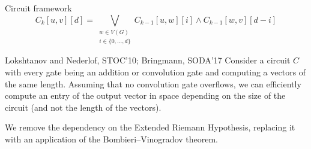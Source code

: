 \begin{frame}{Circuit framework}
    $$C_k[u,v][d]=\bigvee_{\substack{w\in V(G) \\  i\in \{0,\ldots,d\}}} C_{k-1}[u,w][i] \wedge C_{k-1}[w,v][d-i]$$
    
    \pause 
     
    \begin{block}{Lokshtanov and Nederlof, STOC'10; Bringmann, SODA'17}
    Consider a circuit $C$ with every gate being an addition or convolution gate and computing a vectors of the same length.
    Assuming that no convolution gate overflows,
    we can efficiently compute an entry of the output vector in space depending on the size of the circuit
    (and not the length of the vectors).
    \end{block}
    \pause
    
    \begin{alertblock}{}
    We remove the dependency on the Extended Riemann Hypothesis, replacing it with an application of the Bombieri--Vinogradov theorem.\\ 
    \end{alertblock}
    
\end{frame}
    